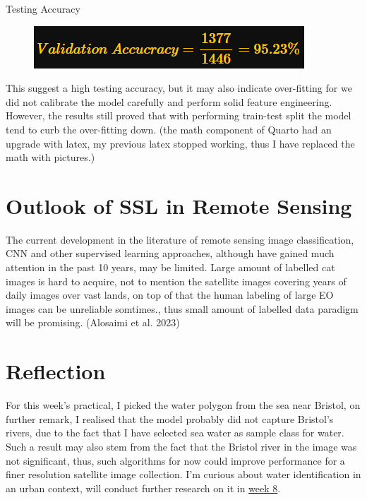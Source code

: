 \documentclass[
  letterpaper,
  DIV=11,
  numbers=noendperiod]{scrreprt}
\begin{document}
Testing Accuracy

\begin{figure}

{\centering \includegraphics{images/wk7/test_accu.png}

}

\end{figure}

This suggest a high testing accuracy, but it may also indicate
over-fitting for we did not calibrate the model carefully and perform
solid feature engineering. However, the results still proved that with
performing train-test split the model tend to curb the over-fitting
down. (the math component of Quarto had an upgrade with latex, my
previous latex stopped working, thus I have replaced the math with
pictures.)

\hypertarget{outlook-of-ssl-in-remote-sensing}{%
\section*{Outlook of SSL in Remote
Sensing}\label{outlook-of-ssl-in-remote-sensing}}


The current development in the literature of remote sensing image
classification, CNN and other supervised learning approaches, although
have gained much attention in the past 10 years, may be limited. Large
amount of labelled cat images is hard to acquire, not to mention the
satellite images covering years of daily images over vast lands, on top
of that the human labeling of large EO images can be unreliable
somtimes., thus small amount of labelled data paradigm will be
promising. (Alosaimi et al. 2023)

\hypertarget{reflection-3}{%
\section*{Reflection}\label{reflection-3}}


For this week's practical, I picked the water polygon from the sea near
Bristol, on further remark, I realised that the model probably did not
capture Bristol's rivers, due to the fact that I have selected sea water
as sample class for water. Such a result may also stem from the fact
that the Bristol river in the image was not significant, thus, such
algorithms for now could improve performance for a finer resolution
satellite image collection. I'm curious about water identification in an
urban context, will conduct further research on it in
\protect\hyperlink{week-8-classification-with-google-earth-engine-ii}{week
8}.
\end{document}

